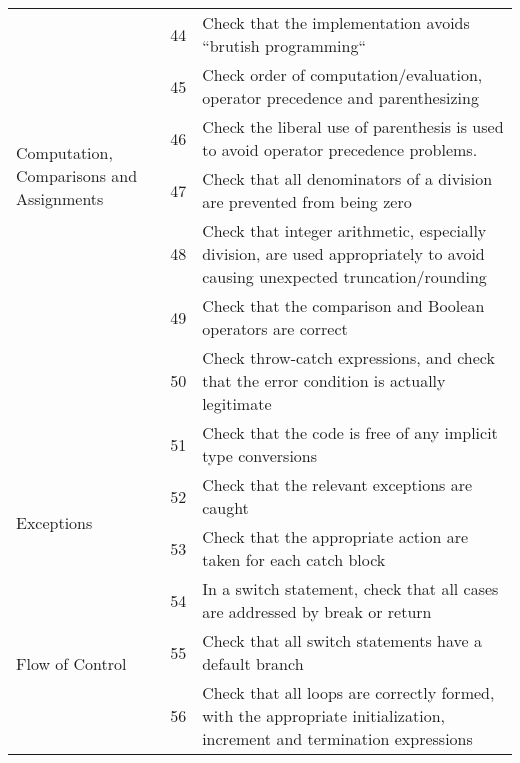 \documentclass[11pt, a4paper,titlepage]{article}
\begin{document}
									\begin{tabularx}{\textwidth}{| X | l | X |}
										\hline
	\multirow{6}{*}{Computation, Comparisons and Assignments}& \label{itm:44} 44 &  
										Check that the implementation avoids “brutish programming“
										\\	\cline{2-3}
										& \label{itm:45} 45 &  
										Check order of computation/evaluation, operator precedence and
										parenthesizing
										\\	\cline{2-3}
										& \label{itm:46} 46 &  
										Check the liberal use of parenthesis is used to avoid operator precedence
										problems.
										\\	\cline{2-3}
										& \label{itm:47} 47 &  
										Check that all denominators of a division are prevented from being zero
										\\	\cline{2-3}
										& \label{itm:48} 48 &  
										Check that integer arithmetic, especially division, are used appropriately
										to avoid causing unexpected truncation/rounding
										\\	\cline{2-3}
										& \label{itm:49} 49 &  
										Check that the comparison and Boolean operators are correct
										\\	\cline{2-3}
										& \label{itm:50} 50 &  
										Check throw-catch expressions, and check that the error condition is
										actually legitimate
										\\	\cline{2-3}
										& \label{itm:51} 51 &  
										Check that the code is free of any implicit type conversions
										\\   \hline
	\multirow{2}{*}{Exceptions}			& \label{itm:52} 52 &  
										Check that the relevant exceptions are caught
										\\	\cline{2-3}
										& \label{itm:53} 53 &  
										Check that the appropriate action are taken for each catch block
										\\   \hline
	\multirow{3}{*}{Flow of Control}	& \label{itm:54} 54 &  
										In a switch statement, check that all cases are addressed by break or
										return
										\\	\cline{2-3}
										& \label{itm:55} 55 &  
										Check that all switch statements have a default branch
										\\	\cline{2-3}
										& \label{itm:56} 56 &  
										Check that all loops are correctly formed, with the appropriate
										initialization, increment and termination expressions
										\\   \hline	

\end{tabularx}
\end{document}
